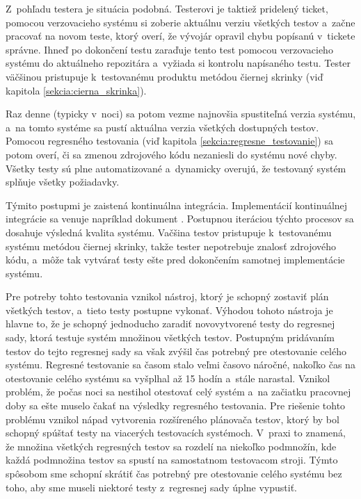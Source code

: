 Z~pohľadu testera je situácia podobná. Testerovi je taktiež pridelený ticket, pomocou verzovacieho systému si zoberie aktuálnu verziu
všetkých testov a~začne pracovať na novom teste, ktorý overí, že vývojár opravil chybu popísanú v~tickete správne.
Ihneď po dokončení testu zaraďuje tento test pomocou verzovacieho systému do aktuálneho repozitára a~vyžiada si
kontrolu napísaného testu. Tester väčšinou pristupuje k~testovanému produktu metódou čiernej skrinky (viď kapitola \ref{sekcia:cierna_skrinka}).

Raz denne (typicky v~noci) sa potom vezme najnovšia spustiteľná verzia systému, a~na tomto systéme sa pustí aktuálna verzia
všetkých dostupných testov. Pomocou regresného testovania (viď kapitola \ref{sekcia:regresne_testovanie}) sa potom overí, či sa zmenou zdrojového kódu nezaniesli do systému nové
chyby. Všetky testy sú plne automatizované a~dynamicky overujú, že testovaný systém splňuje všetky požiadavky.

Týmito postupmi je zaistená kontinuálna integrácia. Implementácií kontinuálnej integrácie 
sa venuje napríklad dokument \cite{Continuous_integration_implementation}. 
Postupnou iteráciou týchto procesov sa dosahuje výsledná kvalita systému. Vačšina testov pristupuje k~testovanému
systému metódou čiernej skrinky, takže tester nepotrebuje znalosť zdrojového kódu, a~môže tak vytvárať testy
ešte pred dokončením samotnej implementácie systému. 

Pre potreby tohto testovania vznikol nástroj, ktorý je schopný zostaviť plán všetkých testov, a~tieto testy postupne vykonať.
Výhodou tohoto nástroja je hlavne to, že je schopný jednoducho zaradiť novovytvorené testy do regresnej sady, ktorá
testuje systém množinou všetkých testov. Postupným pridávaním testov do tejto regresnej sady sa však zvýšil čas potrebný pre otestovanie celého systému.
Regresné testovanie sa časom stalo veľmi časovo náročné, nakoľko čas na otestovanie celého systému sa vyšplhal až 15 hodín a~stále narastal.
Vznikol problém, že počas noci sa nestihol otestovať celý systém a~na začiatku pracovnej doby sa ešte muselo čakať na výsledky regresného testovania.
Pre riešenie tohto problému vznikol nápad vytvorenia rozšíreného plánovača testov, ktorý by bol schopný spúštať testy na viacerých testovacích systémoch.
V~praxi to znamená, že množina všetkých regresných testov sa rozdelí na niekoľko podmnožín, kde každá podmnožina testov sa spustí na samostatnom
testovacom stroji. Týmto spôsobom sme schopní skrátiť čas potrebný pre otestovanie celého systému bez toho, aby sme museli niektoré testy z~regresnej sady 
úplne vypustiť. 

